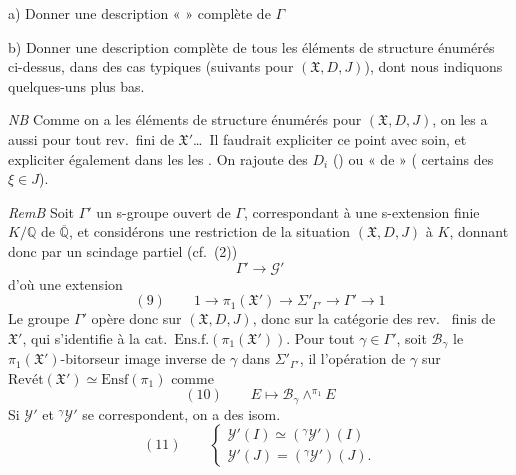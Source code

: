 \documentclass[11pt,a4paper]{article}
\begin{document}
a) Donner une description «  » complète de
$\Gamma$

b) Donner une description complète de tous les éléments de structure énumérés
\struck{\ill{}} ci-dessus, dans des cas typiques (suivants pour
$(\mathfrak{X}, D, J)$), dont nous indiquons quelques-uns plus bas.

\emph{NB} Comme on a les éléments de structure énumérés pour
$(\mathfrak{X}, D, J)$, on les a aussi  pour
 tout rev.\ fini de $\mathfrak{X}'$…\ Il
faudrait expliciter ce point avec soin, et expliciter également dans les
  les 
. On rajoute  des $D_i$ () ou
«  de  »  ( certains des
$\xi \in J$).

\emph{RemB} Soit $\Gamma'$ un s-groupe ouvert de $\Gamma$, correspondant à
une s-extension finie $K/\mathbb{Q}$ de $\overline{\mathbb{Q}}$, et considérons
une restriction de la situation $(\mathfrak{X}, D, J)$ à $K$, donnant donc par
un scindage partiel (cf.\ (2))
\[
  \Gamma' \longrightarrow \mathcal{G}'
\]
d'où une extension
\[
  (9)\qquad 1 \to \pi_1(\mathfrak{X}') \longrightarrow \Sigma'_{\Gamma'}
  \longrightarrow \Gamma' \to 1
\]
Le groupe $\Gamma'$ opère donc sur $(\mathfrak{X}, D, J)$, donc sur
 la catégorie des rev.\
 finis de $\mathfrak{X}'$, \struck{catégorie
qui} qui s'identifie à la cat.\ $\mathrm{Ens.f.}(\pi_1(\mathfrak{X}'))$. Pour
tout $\gamma \in \Gamma'$, soit $\mathcal{B}_{\gamma}$ le
$\pi_1(\mathfrak{X}')$-bitorseur image inverse de $\gamma$ dans
$\Sigma'_{\Gamma'}$, il   l'opération de $\gamma$ sur $\mathrm{Revét}(\mathfrak{X}')
\simeq \mathrm{Ensf}(\pi_1)$ comme
\[
  (10)\qquad E \longmapsto \mathcal{B}_{\gamma} \wedge^{\pi_1} E
\]
Si $\mathcal{Y}'$ et ${}^{\gamma}\mathcal{Y}'$ se correspondent, on a des isom.\
\struck{\ill{}} 
\[
  (11)\qquad \left\{
  \begin{array}{l}
    \mathcal{Y}'(I) \simeq ({}^{\gamma}\mathcal{Y}')(I) \\
    \mathcal{Y}'(J) = ({}^{\gamma}\mathcal{Y}')(J).
  \end{array}\right.
\]
\end{document}
